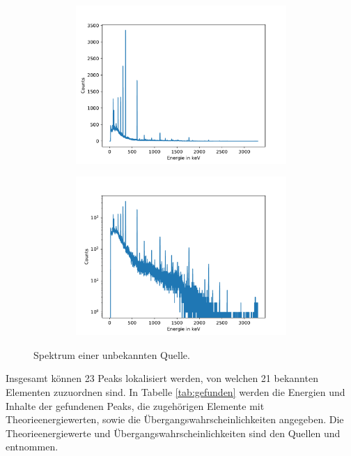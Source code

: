     \begin{figure}[H]
      \centering
      \begin{subfigure}{0.495\textwidth}
        \centering
        \includegraphics[height=6cm, width = 1\textwidth]{germanie/le_allgemein/leenergie.pdf}
      \end{subfigure}
      \begin{subfigure}{0.495\textwidth}
        \centering
        \includegraphics[height=6cm, width = 1\textwidth]{germanie/le_allgemein/leenergielog.pdf}
      \end{subfigure}
      \caption{Spektrum einer unbekannten Quelle.}
      \label{fig:un}
    \end{figure}

    Insgesamt können 23 Peaks lokalisiert werden, von welchen 21
    bekannten Elementen zuzuordnen sind.
    In Tabelle \ref{tab:gefunden} werden die Energien und Inhalte der gefundenen Peaks,
    die zugehörigen Elemente mit Theorieenergiewerten, sowie die
    Übergangswahrscheinlichkeiten angegeben.
    Die Theorieenergiewerte und Übergangswahrscheinlichkeiten sind
    den Quellen \cite{nuklide} und \cite{anleitungv18} entnommen.

